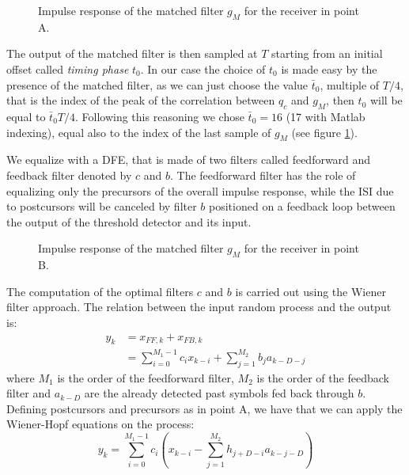 \documentclass[a4paper,11.5pt]{article}
\begin{document}
\begin{figure}[H]
	\begin{center}   
		\caption{Impulse response of the matched filter $g_{M}$ for the receiver in point A.}
		\label{fig:A_gm}
	\end{center}
\end{figure} 

The output of the matched filter is then sampled at $T$ starting from an initial offset called \emph{timing phase} $t_0$. In our case the choice of $t_0$ is made easy by the presence of the matched filter, as we can just choose the value $\bar{t}_0$, multiple of $T/4$, that is the index of the peak of the correlation between $q_c$ and $g_M$, then $t_0$ will be equal to $\bar{t}_0 T/4$. Following this reasoning we chose $\bar{t}_0=16$ (17 with Matlab indexing), equal also to the index of the last sample of $g_M$ (see figure \ref{fig:A_gm}).

We equalize with a DFE, that is made of two filters called feedforward and feedback filter denoted by $c$ and $b$. The feedforward filter has the role of equalizing only the precursors of the overall impulse response, while the ISI due to postcursors will be canceled by filter $b$ positioned on a feedback loop between the output of the threshold detector and its input. 

\begin{figure}[H]
	\begin{center}   
		\caption{Impulse response of the matched filter $g_{M}$ for the receiver in point B.}
		\label{fig:B_gm}
	\end{center}
\end{figure}

The computation of the optimal filters $c$ and $b$ is carried out using the Wiener filter approach. The relation between the input random process and the output is:
\begin{equation}
\begin{split}
y_k &= x_{FF,k} + x_{FB,k} \\
&= \sum_{i=0}^{M_1-1}c_ix_{k-i} + \sum_{j=1}^{M_2}b_ja_{k-D-j}
\end{split} 
\end{equation}
where $M_1$ is the order of the feedforward filter, $M_2$ is the order of the feedback filter and $a_{k-D}$ are the already detected past symbols fed back through $b$. Defining postcursors and precursors as in point A, we have that we can apply the Wiener-Hopf equations on the process:
\begin{equation} \label{eq:yk}
y_k = \sum_{i=0}^{M_1-1}c_i \left(x_{k-i}-\sum_{j=1}^{M_2}h_{j+D-i}a_{k-j-D} \right)
\end{equation}
\end{document}
